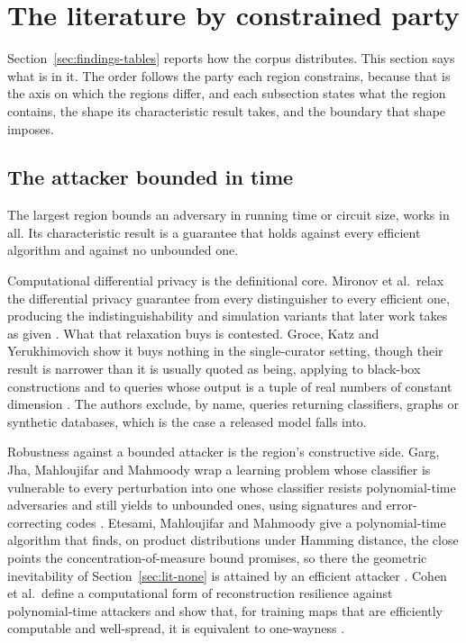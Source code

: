 \section{The literature by constrained party}
\label{sec:literature}

Section~\ref{sec:findings-tables} reports how the corpus distributes. This section
says what is in it. The order follows the party each region constrains, because
that is the axis on which the regions differ, and each subsection states what the
region contains, the shape its characteristic result takes, and the boundary that
shape imposes.

\subsection{The attacker bounded in time}

The largest region bounds an adversary in running time or circuit size,
\AttackerTimeCirc{} works in all. Its characteristic result is a guarantee that
holds against every efficient algorithm and against no unbounded one.

Computational differential privacy is the definitional core. Mironov et al.\ relax
the differential privacy guarantee from every distinguisher to every efficient one,
producing the indistinguishability and simulation variants that later work takes as
given \cite{MPRV09}. What that relaxation buys is contested. Groce, Katz and
Yerukhimovich show it buys nothing in the single-curator setting, though their
result is narrower than it is usually quoted as being, applying to black-box
constructions and to queries whose output is a tuple of real numbers of constant
dimension \cite{GKY11}. The authors exclude, by name, queries returning
classifiers, graphs or synthetic databases, which is the case a released model
falls into.

Robustness against a bounded attacker is the region's constructive side. Garg, Jha,
Mahloujifar and Mahmoody wrap a learning problem whose classifier is vulnerable to
every perturbation into one whose classifier resists polynomial-time adversaries
and still yields to unbounded ones, using signatures and error-correcting codes
\cite{GJMM20}. Etesami, Mahloujifar and Mahmoody give a polynomial-time algorithm
that finds, on product distributions under Hamming distance, the close points the
concentration-of-measure bound promises, so there the geometric inevitability of
Section~\ref{sec:lit-none} is attained by an efficient attacker \cite{EMM20}.
Cohen et al.\ define a computational form of reconstruction resilience against
polynomial-time attackers and show that, for training maps that are efficiently
computable and well-spread, it is equivalent to one-wayness \cite{CKMMNST25}.

